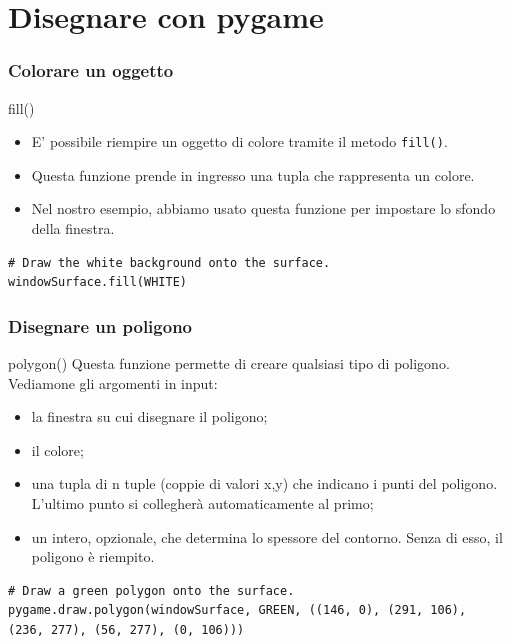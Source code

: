 \documentclass{beamer}
\begin{document}
\section{Disegnare con pygame}

\begin{frame}[fragile]
\frametitle{Colorare un oggetto}
\begin{block}{fill()}
	\begin{itemize}
		\item E' possibile riempire un oggetto di colore tramite il metodo \texttt{fill()}.
		\item Questa funzione prende in ingresso una tupla che rappresenta un colore.
		\item Nel nostro esempio, abbiamo usato questa funzione per impostare lo sfondo della finestra.
	\end{itemize}
\end{block}
\begin{lstlisting}
# Draw the white background onto the surface.
windowSurface.fill(WHITE)
\end{lstlisting}
\end{frame}

\begin{frame}[fragile]
\frametitle{Disegnare un poligono}
\begin{block}{polygon()}
	Questa funzione permette di creare qualsiasi tipo di poligono. Vediamone gli argomenti in input:
	\begin{itemize}
		\item la finestra su cui disegnare il poligono;
		\item il colore;
		\item una tupla di n tuple (coppie di valori x,y) che indicano i punti del poligono. L'ultimo punto si collegherà automaticamente al primo;
		\item un intero, opzionale, che determina lo spessore del contorno. Senza di esso, il poligono è riempito.
	\end{itemize}
\end{block}
\begin{lstlisting}
# Draw a green polygon onto the surface.
pygame.draw.polygon(windowSurface, GREEN, ((146, 0), (291, 106),
(236, 277), (56, 277), (0, 106)))
\end{lstlisting}
\end{frame}
\end{document}
